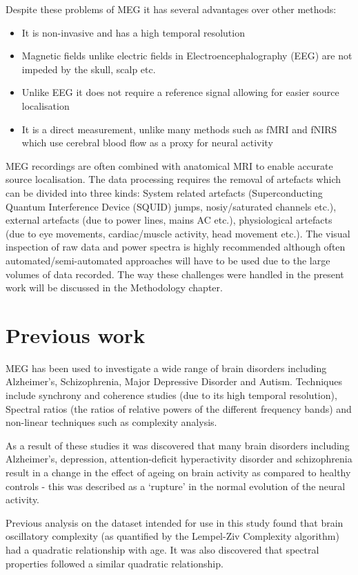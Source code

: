 Despite these problems of MEG it has several advantages over other methods:

\begin{itemize}
\item It is non-invasive and has a high temporal resolution
\item Magnetic fields unlike electric fields in Electroencephalography (EEG) are not impeded by the skull, scalp etc.
\item Unlike EEG it does not require a reference signal allowing for easier source localisation\cite{Zani2002}
\item It is a direct measurement, unlike many methods such as fMRI and fNIRS which use cerebral blood flow as a proxy for neural activity

\end{itemize}

MEG recordings are often combined with anatomical MRI to enable accurate source localisation. The data processing requires the removal of artefacts which can be divided into three kinds: System related artefacts (Superconducting Quantum Interference Device (SQUID) jumps, nosiy/saturated channels etc.), external artefacts (due to power lines, mains AC etc.), physiological artefacts (due to eye movements, cardiac/muscle activity, head movement etc.). \cite{Gross2013} The visual inspection of raw data and power spectra is highly recommended although often automated/semi-automated approaches will have to be used due to the large volumes of data recorded. The way these challenges were handled in the present work will be discussed in the Methodology chapter.



\section{Previous work}


MEG has been used to investigate a wide range of brain disorders including Alzheimer's, Schizophrenia, Major Depressive Disorder and Autism. Techniques include synchrony and coherence studies (due to its high temporal resolution), Spectral ratios (the ratios of relative powers of the different frequency bands) and non-linear techniques such as complexity analysis.\cite{Williams2010}

As a result of these studies it was discovered that many brain disorders including Alzheimer's, depression, attention-deficit hyperactivity disorder and schizophrenia result in a change in the effect of ageing on brain activity as compared to healthy controls - this was described as a `rupture' in the normal evolution of the neural activity.\cite{Escudero2013}

Previous analysis on the dataset intended for use in this study found that brain oscillatory complexity (as quantified by the Lempel-Ziv Complexity algorithm) had a quadratic relationship with age.\cite{Fernandez2012} It was also discovered that spectral properties followed a similar quadratic relationship.\cite{Gomez2013}






